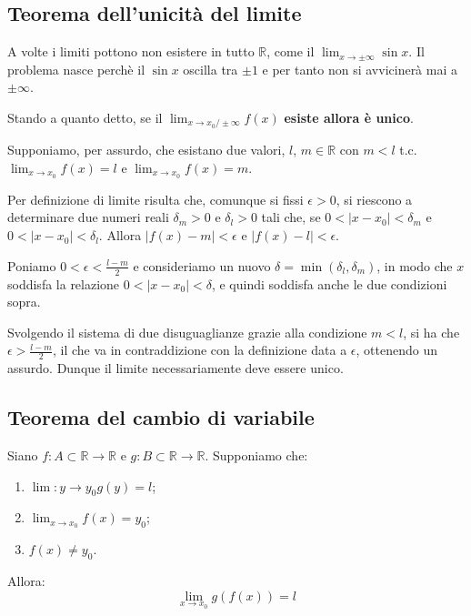 \subsection{Teorema dell'unicità del limite}
    A volte i limiti pottono non esistere in tutto $\mathbb{R}$, come il $\lim_{x\to\pm\infty}\sin x$.
    Il problema nasce perchè il $\sin x$ oscilla tra $\pm 1$ e per tanto non si avvicinerà mai a $\pm\infty$.
    
    Stando a quanto detto, se il $\lim_{x\rightarrow x_0/\pm\infty}f(x)$ \textbf{esiste allora è unico}.

    \begin{dimostration}
        Supponiamo, per assurdo, che esistano due valori, $l$, $m\in\mathbb{R}$ con $m<l$ t.c. $\lim_{x \to x_0}f(x)=l$ e $\lim_{x \to x_0}f(x)=m$.
        
        Per definizione di limite risulta che, comunque si fissi $\epsilon>0$, si riescono a determinare due numeri reali $\delta_m>0$ e $\delta_l>0$ tali che, se $0<|x-x_0|<\delta_m$ e $0<|x-x_0|<\delta_l$. Allora $|f(x)-m|<\epsilon$ e $|f(x)-l|<\epsilon$. 
        
        Poniamo $0<\epsilon<\frac{l-m}{2}$  e consideriamo un nuovo $\delta=\min(\delta_l,\delta_m)$, in modo che $x$ soddisfa la relazione
        $0<|x-x_0|<\delta$, e quindi soddisfa anche le due condizioni sopra. 
        
        Svolgendo il sistema di due disuguaglianze grazie alla condizione $m<l$, si ha che $\epsilon>\frac{l-m}{2}$, il che va in contraddizione con la definizione data a $\epsilon$, ottenendo un assurdo. Dunque il limite necessariamente deve essere unico.\flushright{$\blacksquare$}

    \end{dimostration}


\subsection{Teorema del cambio di variabile}
Siano $f:A\subset\mathbb{R}\rightarrow\mathbb{R}$ e $g:B\subset\mathbb{R}\rightarrow\mathbb{R}$.
Supponiamo che:
\begin{enumerate}[label=(\alph*)]
    \item $\lim:{y\to y_0}g(y)=l$;
    \item $\lim_{x\to x_0}f(x)=y_0$;
    \item $f(x)\neq y_0$.
\end{enumerate}
Allora:
\begin{equation}
    \lim_{x\to x_0}g(f(x))=l
\end{equation}

